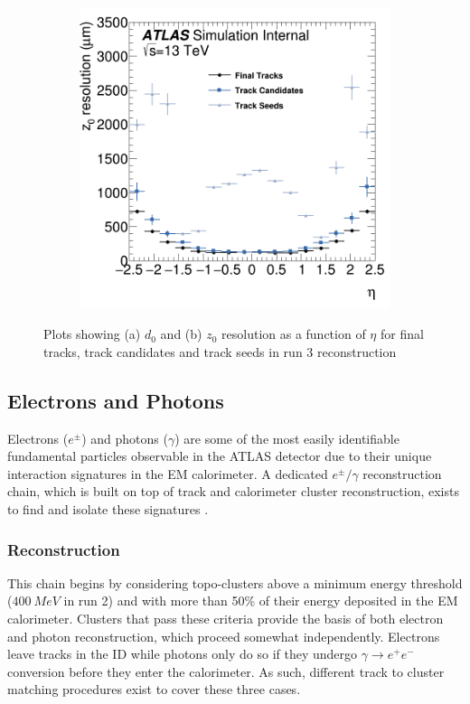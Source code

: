 \begin{figure}
\begin{subfigure}{.49\textwidth}
        \includegraphics[width=\textwidth]{images/Impact_Parameter_Resolution_z0.png}
        \caption{}
        \label{fig:IP_Resolution_z0}
    \end{subfigure}
    \caption{Plots showing (a) $d_0$ and (b) $z_0$ resolution as a function of $\eta$ for final tracks, track candidates 
    and track seeds in run 3 reconstruction}
    \label{fig:IP_Resolution}
\end{figure}

\subsection{Electrons and Photons}

Electrons ($e^{\pm}$) and photons ($\gamma$) are some of the most easily identifiable fundamental particles 
observable in the ATLAS detector due to their unique interaction signatures in the EM calorimeter. A dedicated 
$e^{\pm}/\gamma$ reconstruction chain, which is built on top of track and calorimeter cluster reconstruction, exists to 
find and isolate these signatures \cite{atlas-electrons-photons}.

\subsubsection*{Reconstruction}

This chain begins by considering topo-clusters above a minimum energy threshold ($400\ MeV$ in run 2) and with more than 
50\% of their energy deposited in the EM calorimeter. Clusters that pass these criteria provide the basis of both electron 
and photon reconstruction, which proceed somewhat independently. Electrons leave tracks in the ID while photons only do so 
if they undergo $\gamma \rightarrow e^+e^-$ conversion before they enter the calorimeter. As such, different track to 
cluster matching procedures exist to cover these three cases. \par

